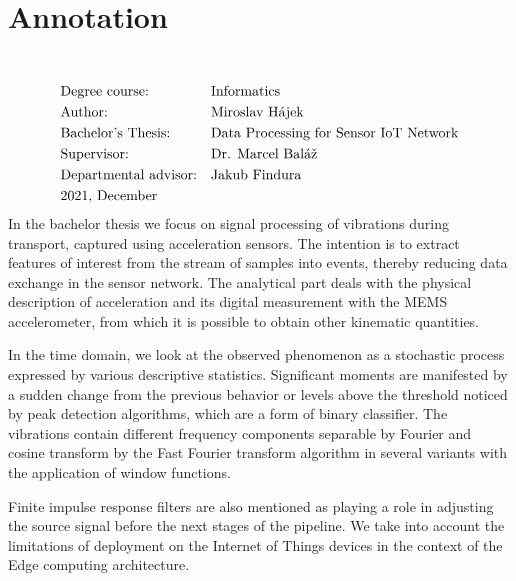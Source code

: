 \section*{Annotation}
\UniversityEN \\
\uppercase{\FacultyEN}
\vspace{-8pt}
{\setlength{\mathindent}{0cm}
\begin{align*}
&\text{Degree course:} && \text{\StudyProgrammeEN} \\
&\text{Author:} && \text{\Author} \\
&\text{\ThesisEN:} && \text{\TitleEN} \\
&\text{Supervisor:} && \text{\SupervisorEN} \\
&\text{Departmental advisor:} && \text{\PedagogicalSupervisorEN} \\
&\text{\DateEN}
\end{align*}}
In the bachelor thesis we focus on signal processing of vibrations during transport, captured
using acceleration sensors. The intention is to extract features of interest from the stream of samples into events, 
thereby reducing data exchange in the sensor network. The analytical part deals with the physical description of acceleration
and its digital measurement with the MEMS accelerometer, from which it is possible to obtain other kinematic quantities.

In the time domain, we look at the observed phenomenon as a stochastic process expressed by various descriptive statistics. 
Significant moments are manifested by a sudden change from the previous behavior or levels above the threshold
noticed by peak detection algorithms, which are a form of binary classifier. The vibrations contain different frequency 
components separable by Fourier and cosine transform by the Fast Fourier transform algorithm in several variants with the
application of window functions.

Finite impulse response filters are also mentioned as playing a role in adjusting the source signal before the next stages of 
the pipeline. We take into account the limitations of deployment on the Internet of Things devices in the context of the Edge 
computing architecture.

\emptypage 